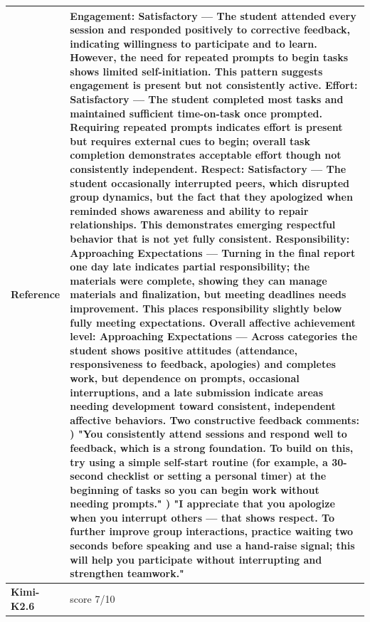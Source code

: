 \begin{longtable}{@{}l p{12.5cm}@{}}
  \textbf{Reference} & Engagement: Satisfactory --- The student attended every session and responded positively to corrective feedback, indicating willingness to participate and to learn. However, the need for repeated prompts to begin tasks shows limited self-initiation. This pattern suggests engagement is present but not consistently active. \newline Effort: Satisfactory --- The student completed most tasks and maintained sufficient time-on-task once prompted. Requiring repeated prompts indicates effort is present but requires external cues to begin; overall task completion demonstrates acceptable effort though not consistently independent. \newline Respect: Satisfactory --- The student occasionally interrupted peers, which disrupted group dynamics, but the fact that they apologized when reminded shows awareness and ability to repair relationships. This demonstrates emerging respectful behavior that is not yet fully consistent. \newline Responsibility: Approaching Expectations --- Turning in the final report one day late indicates partial responsibility; the materials were complete, showing they can manage materials and finalization, but meeting deadlines needs improvement. This places responsibility slightly below fully meeting expectations. \newline Overall affective achievement level: Approaching Expectations --- Across categories the student shows positive attitudes (attendance, responsiveness to feedback, apologies) and completes work, but dependence on prompts, occasional interruptions, and a late submission indicate areas needing development toward consistent, independent affective behaviors. \newline Two constructive feedback comments: \newline 1) "You consistently attend sessions and respond well to feedback, which is a strong foundation. To build on this, try using a simple self-start routine (for example, a 30-second checklist or setting a personal timer) at the beginning of tasks so you can begin work without needing prompts." \newline 2) "I appreciate that you apologize when you interrupt others --- that shows respect. To further improve group interactions, practice waiting two seconds before speaking and use a hand-raise signal; this will help you participate without interrupting and strengthen teamwork." \\
  \midrule
  \textbf{Kimi-K2.6} & score 7/10 \\

\end{longtable}
